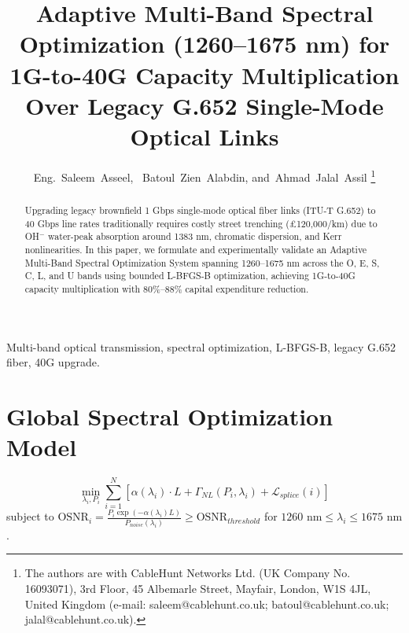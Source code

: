 \documentclass[journal]{IEEEtran}
\begin{document}
\title{Adaptive Multi-Band Spectral Optimization (1260--1675 nm) for 1G-to-40G Capacity Multiplication Over Legacy G.652 Single-Mode Optical Links}

\author{Eng.~Saleem~Asseel,~ Batoul~Zien~Alabdin, and~Ahmad~Jalal~Assil%
\thanks{The authors are with CableHunt Networks Ltd. (UK Company No. 16093071), 3rd Floor, 45 Albemarle Street, Mayfair, London, W1S 4JL, United Kingdom (e-mail: saleem@cablehunt.co.uk; batoul@cablehunt.co.uk; jalal@cablehunt.co.uk).}}

\maketitle

\begin{abstract}
Upgrading legacy brownfield 1 Gbps single-mode optical fiber links (ITU-T G.652) to 40 Gbps line rates traditionally requires costly street trenching (\pounds 120,000/km) due to OH$^-$ water-peak absorption around 1383 nm, chromatic dispersion, and Kerr nonlinearities. In this paper, we formulate and experimentally validate an Adaptive Multi-Band Spectral Optimization System spanning 1260--1675 nm across the O, E, S, C, L, and U bands using bounded L-BFGS-B optimization, achieving 1G-to-40G capacity multiplication with 80\%--88\% capital expenditure reduction.
\end{abstract}

\begin{IEEEkeywords}
Multi-band optical transmission, spectral optimization, L-BFGS-B, legacy G.652 fiber, 40G upgrade.
\end{IEEEkeywords}

\section{Global Spectral Optimization Model}
\begin{equation}
\min_{\lambda_i, P_i} \sum_{i=1}^{N} \left[ \alpha(\lambda_i) \cdot L + \Gamma_{NL}(P_i, \lambda_i) + \mathcal{L}_{splice}(i) \right]
\end{equation}
subject to $\text{OSNR}_i = \frac{P_i \exp(-\alpha(\lambda_i)L)}{P_{noise}(\lambda_i)} \ge \text{OSNR}_{threshold}$ for $1260\text{ nm} \le \lambda_i \le 1675\text{ nm}$.
\end{document}
